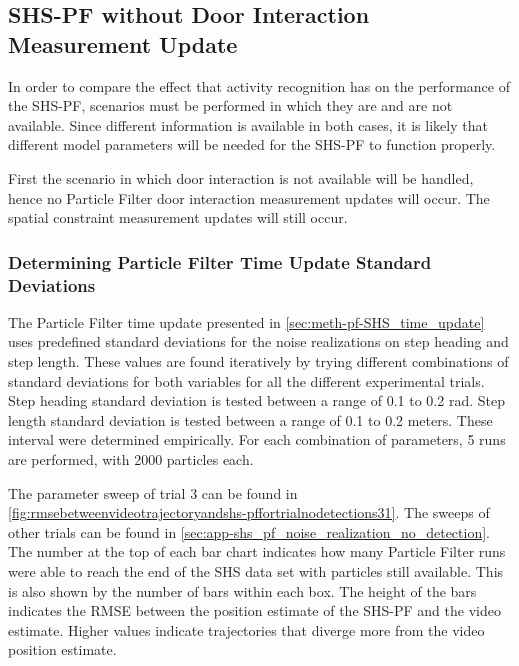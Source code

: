 \subsection{SHS-PF without Door Interaction Measurement Update}
\label{sec:SHS-PF_without_door_interaction}
In order to compare the effect that activity recognition has on the performance of the SHS-PF, scenarios must be performed in which they are and are not available. Since different information is available in both cases, it is likely that different model parameters will be needed for the SHS-PF to function properly.\par 

First the scenario in which door interaction is not available will be handled, hence no Particle Filter door interaction measurement updates will occur. The spatial constraint measurement updates will still occur.

\subsubsection{Determining Particle Filter Time Update Standard Deviations}

The Particle Filter time update presented in \cref{sec:meth-pf-SHS_time_update} uses predefined standard deviations for the noise realizations on step heading and step length. These values are found iteratively by trying different combinations of standard deviations for both variables for all the different experimental trials. Step heading standard deviation is tested between a range of 0.1 to 0.2 rad. Step length standard deviation is tested between a range of 0.1 to 0.2 meters. These interval were determined empirically. For each combination of parameters, 5 runs are performed, with 2000 particles each.\par 

The parameter sweep of trial 3 can be found in \cref{fig:rmsebetweenvideotrajectoryandshs-pffortrialnodetections31}. The sweeps of other trials can be found in \cref{sec:app-shs_pf_noise_realization_no_detection}. The number at the top of each bar chart indicates how many Particle Filter runs were able to reach the end of the SHS data set with particles still available. This is also shown by the number of bars within each box. The height of the bars indicates the RMSE between the position estimate of the SHS-PF and the video estimate. Higher values indicate trajectories that diverge more from the video position estimate.\par 

